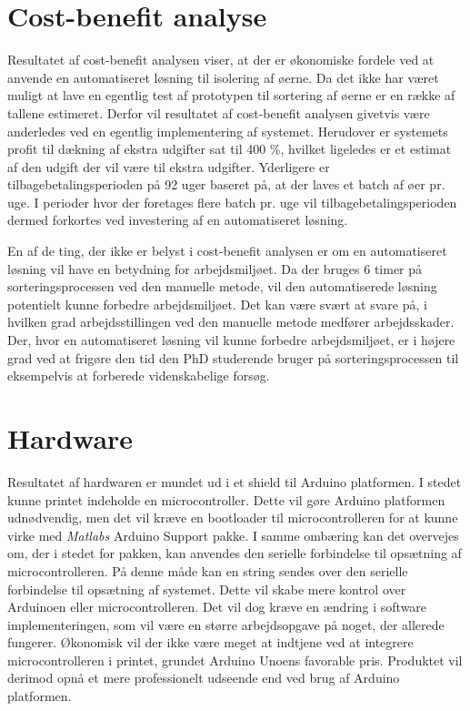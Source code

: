\section{Cost-benefit analyse}
Resultatet af cost-benefit analysen viser, at der er økonomiske fordele ved at anvende en automatiseret løsning til isolering af øerne. Da det ikke har været muligt at lave en egentlig test af prototypen til sortering af øerne er en række af tallene estimeret. Derfor vil resultatet af cost-benefit analysen givetvis være anderledes ved en egentlig implementering af systemet. Herudover er systemets profit til dækning af ekstra udgifter sat til 400 \%, hvilket ligeledes er et estimat af den udgift der vil være til ekstra udgifter. Yderligere er tilbagebetalingsperioden på 92 uger baseret på, at der laves et batch af øer pr. uge. I perioder hvor der foretages flere batch pr. uge vil tilbagebetalingsperioden dermed forkortes ved investering af en automatiseret løsning.

En af de ting, der ikke er belyst i cost-benefit analysen er om en automatiseret løsning vil have en betydning for arbejdsmiljøet. Da der bruges 6 timer på sorteringsprocessen ved den manuelle metode, vil den automatiserede løsning potentielt kunne forbedre arbejdsmiljøet. Det kan være svært at svare på, i hvilken grad arbejdsstillingen ved den manuelle metode medfører arbejdsskader. Der, hvor en automatiseret løsning vil kunne forbedre arbejdsmiljøet, er i højere grad ved at frigøre den tid den PhD studerende bruger på sorteringsprocessen til eksempelvis at forberede videnskabelige forsøg.

\section{Hardware}
Resultatet af hardwaren er mundet ud i et shield til Arduino platformen. I stedet kunne printet indeholde en microcontroller. Dette vil gøre Arduino platformen udnødvendig, men det vil kræve en bootloader til microcontrolleren for at kunne virke med \textit{Matlabs} Arduino Support pakke. I samme ombæring kan det overvejes om, der i stedet for pakken, kan anvendes den serielle forbindelse til opsætning af microcontrolleren. På denne måde kan en string sendes over den serielle forbindelse til opsætning af systemet. Dette vil skabe mere kontrol over Arduinoen eller microcontrolleren. Det vil dog kræve en ændring i software implementeringen, som vil være en større arbejdsopgave på noget, der allerede fungerer. Økonomisk vil der ikke være meget at indtjene ved at integrere microcontrolleren i printet, grundet Arduino Unoens favorable pris. Produktet vil derimod opnå et mere professionelt udseende end ved brug af Arduino platformen.

